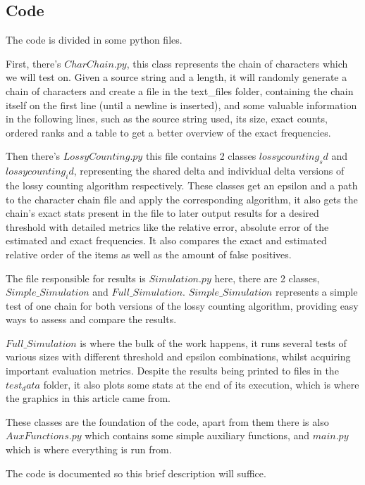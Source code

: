 \documentclass[...]{revdetua}
\begin{document}
\subsection{Code}
The code is divided in some python files.\par
First, there's $CharChain.py$, this class represents the chain of characters which we will test on. Given a source string and a length, it will randomly generate a chain of characters and create a file in the text\_files folder, containing the chain itself on the first line (until a newline is inserted), and some valuable information in the following lines, such as the source string used, its size, exact counts, ordered ranks and a table to get a better overview of the exact frequencies.\par
Then there's $LossyCounting.py$ this file contains 2 classes $lossycounting_sd$ and $lossycounting_id$, representing the shared delta and individual delta versions of the lossy counting algorithm respectively. These classes get an epsilon and a path to the character chain file and apply the corresponding algorithm, it also gets the chain's exact stats present in the file to later output results for a desired threshold with detailed metrics like the relative error, absolute error of the estimated and exact frequencies. It also compares the exact and estimated relative order of the items as well as the amount of false positives.\par
The file responsible for results is $Simulation.py$ here, there are 2 classes, $Simple\_Simulation$ and $Full\_Simulation$.
$Simple\_Simulation$ represents a simple test of one chain for both versions of the lossy counting algorithm, providing easy ways to assess and compare the results.\par
$Full\_Simulation$ is where the bulk of the work happens, it runs several tests of various sizes with different threshold and epsilon combinations, whilst acquiring important evaluation metrics. Despite the results being printed to files in the $test_data$ folder, it also plots some stats at the end of its execution, which is where the graphics in this article came from.\par
These classes are the foundation of the code, apart from them there is also $AuxFunctions.py$ which contains some simple auxiliary functions, and $main.py$ which is where everything is run from.\par
The code is documented so this brief description will suffice.
\end{document}
